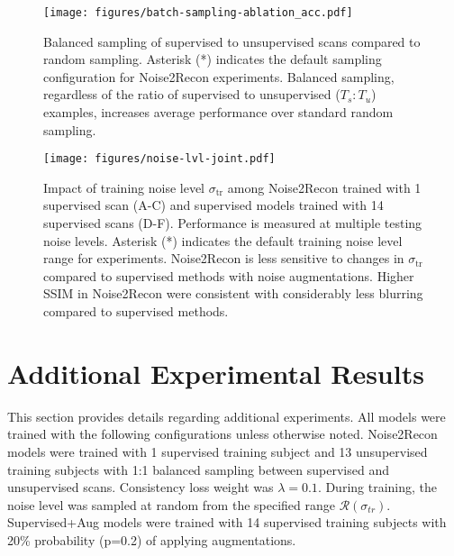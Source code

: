 \documentclass[10pt,twocolumn,letterpaper]{article}
\newcommand{\noiserange}{\mathcal{R}(\sigma_{tr})}
\newcommand{\RV}[1]{{#1}}
\begin{document}
\begin{figure}[t!]
  \centering
  \begin{center}
      \texttt{[image: figures/batch-sampling-ablation\_acc.pdf]}
  \end{center}
  \caption{Balanced sampling of supervised to unsupervised scans compared to random sampling. Asterisk (*) indicates the default sampling configuration for Noise2Recon experiments. Balanced sampling, regardless of the ratio of supervised to unsupervised \RV{($T_s:T_u$)} examples, increases average performance over standard random sampling.}
  \label{fig:abl-balanced-sampling}
\end{figure}


\begin{figure}[t!]
  \centering
  \begin{center}
      \texttt{[image: figures/noise-lvl-joint.pdf]}
  \end{center}
  \caption{Impact of training noise level $\sigma_{\text{tr}}$ among Noise2Recon trained with 1 supervised scan (A-C) and supervised models trained with 14 supervised scans (D-F). Performance is measured at multiple testing noise levels. Asterisk (*) indicates the default training noise level range for experiments. Noise2Recon is less sensitive to changes in $\sigma_{\text{tr}}$ compared to supervised methods with noise augmentations. Higher SSIM in Noise2Recon were consistent with considerably less blurring compared to supervised methods.}
  \label{fig:noise-lvl-ablation-multi-noise}
\end{figure}


\section{Additional Experimental Results}
\label{app:additional-exps}
This section provides details regarding additional experiments. All models were trained with the following configurations unless otherwise noted. Noise2Recon models were trained with 1 supervised training subject and 13 unsupervised training subjects with 1:1 balanced sampling between supervised and unsupervised scans. Consistency loss weight was $\lambda=0.1$. During training, the noise level was sampled at random from the specified range $\noiserange$. Supervised+Aug models were trained with 14 supervised training subjects with 20\% probability (p=0.2) of applying augmentations.


\end{document}
